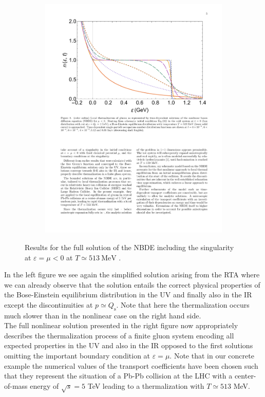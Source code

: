\begin{figure}[H]
\begin{subfigure}[c]{0.495\textwidth}
\includegraphics[width=\textwidth]{figures/nbde_full_result}
\end{subfigure}
\caption{Results for the full solution of the NBDE including the singularity at $\varepsilon=\mu<0$ at $T \simeq 513\ \mathrm{MeV}$ \cite{Wolschin2020_1}. }
\label{fig:singularity}
\end{figure}
\noindent
In the left figure we see again the simplified solution arising from the RTA where we can already observe that the solution entails the correct physical properties of the Bose-Einstein equilibrium distribution in the UV and finally also in the IR except the discontinuities at $p\simeq Q_{\mathrm{s}}$. Note that here the thermalization occurs much slower than in the nonlinear case on the right hand side.\\
\noindent
The full nonlinear solution presented in the right figure now appropriately describes the thermalization process of a finite gluon system encoding all expected properties in the UV and also in the IR opposed to the first solutions omitting the important boundary condition at $\varepsilon=\mu$. Note that in our concrete example the numerical values of the transport coefficients have been chosen such that they represent the situation of a Pb-Pb collision at the LHC with a center-of-mass energy of $\sqrt{s}=5$ TeV leading to a thermalization with $T\simeq 513$ MeV.